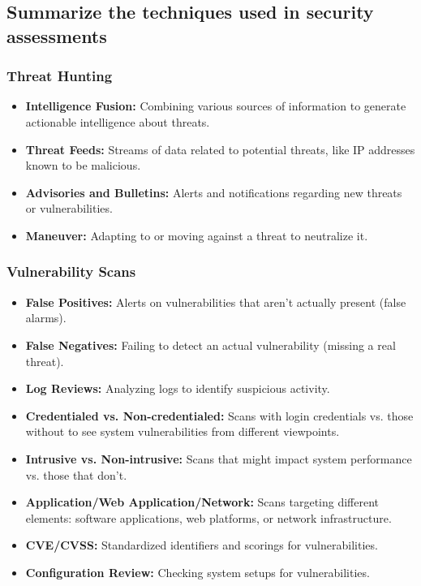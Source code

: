 \begin{fullwidth} 
    \subsection{Summarize the techniques used in security assessments}
    \subsubsection*{\color{red}Threat Hunting}
    \begin{itemize}
        \item \textbf{Intelligence Fusion:} Combining various sources of information to generate actionable intelligence about threats.
        \item \textbf{Threat Feeds:} Streams of data related to potential threats, like IP addresses known to be malicious.
        \item \textbf{Advisories and Bulletins:} Alerts and notifications regarding new threats or vulnerabilities.
        \item \textbf{Maneuver:} Adapting to or moving against a threat to neutralize it.
    \end{itemize}
    \subsubsection*{\color{red}Vulnerability Scans}
    \begin{itemize}
        \item \textbf{False Positives:} Alerts on vulnerabilities that aren’t actually present (false alarms).
        \item \textbf{False Negatives:} Failing to detect an actual vulnerability (missing a real threat).
        \item \textbf{Log Reviews:} Analyzing logs to identify suspicious activity.
        \item \textbf{Credentialed vs. Non-credentialed:} Scans with login credentials vs. those without to see system vulnerabilities from different viewpoints.
        \item \textbf{Intrusive vs. Non-intrusive:} Scans that might impact system performance vs. those that don’t.
        \item \textbf{Application/Web Application/Network:} Scans targeting different elements: software applications, web platforms, or network infrastructure.
        \item \textbf{CVE/CVSS:} Standardized identifiers and scorings for vulnerabilities.
        \item \textbf{Configuration Review:} Checking system setups for vulnerabilities.
    \end{itemize}


\end{fullwidth}
